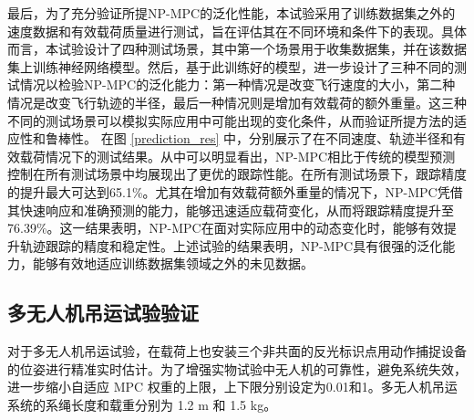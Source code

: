 \documentclass[lang=chs, degree=master, blindreview=true, winfonts=true]{yanputhesis}
\begin{document}
最后，为了充分验证所提NP-MPC的泛化性能，本试验采用了训练数据集之外的速度数据和有效载荷质量进行测试，旨在评估其在不同环境和条件下的表现。具体而言，本试验设计了四种测试场景，其中第一个场景用于收集数据集，并在该数据集上训练神经网络模型。然后，基于此训练好的模型，进一步设计了三种不同的测试情况以检验NP-MPC的泛化能力：第一种情况是改变飞行速度的大小，第二种情况是改变飞行轨迹的半径，最后一种情况则是增加有效载荷的额外重量。这三种不同的测试场景可以模拟实际应用中可能出现的变化条件，从而验证所提方法的适应性和鲁棒性。
在图 \ref{prediction_res} 中，分别展示了在不同速度、轨迹半径和有效载荷情况下的测试结果。从中可以明显看出，NP-MPC相比于传统的模型预测控制在所有测试场景中均展现出了更优的跟踪性能。在所有测试场景下，跟踪精度的提升最大可达到65.1\%。尤其在增加有效载荷额外重量的情况下，NP-MPC凭借其快速响应和准确预测的能力，能够迅速适应载荷变化，从而将跟踪精度提升至76.39\%。这一结果表明，NP-MPC在面对实际应用中的动态变化时，能够有效提升轨迹跟踪的精度和稳定性。上述试验的结果表明，NP-MPC具有很强的泛化能力，能够有效地适应训练数据集领域之外的未见数据。

\subsection{多无人机吊运试验验证}
对于多无人机吊运试验，在载荷上也安装三个非共面的反光标识点用动作捕捉设备的位姿进行精准实时估计。为了增强实物试验中无人机的可靠性，避免系统失效，进一步缩小自适应 MPC 权重的上限，上下限分别设定为0.01和1。多无人机吊运系统的系绳长度和载重分别为 1.2 m 和 1.5 kg。
\end{document}
